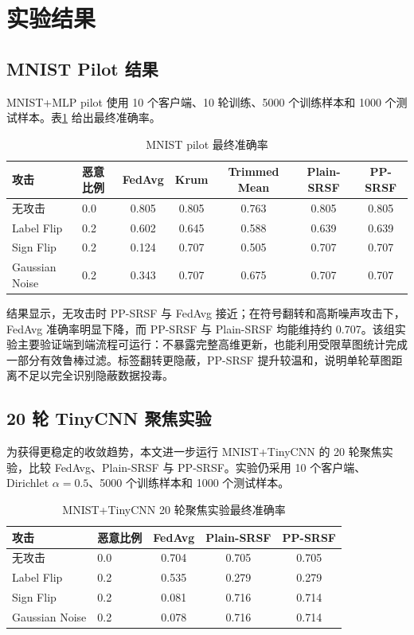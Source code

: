 \documentclass[final]{jcr}
\begin{document}
\section{实验结果}
\subsection{MNIST Pilot 结果}
MNIST+MLP pilot 使用 10 个客户端、10 轮训练、5000 个训练样本和 1000 个测试样本。表\ref{tab:mnist-pilot} 给出最终准确率。

\begin{table}
\centering
\caption{MNIST pilot 最终准确率}{}
\label{tab:mnist-pilot}
\begin{tabular}{llccccc}
\toprule
攻击 & 恶意比例 & FedAvg & Krum & Trimmed Mean & Plain-SRSF & PP-SRSF\\
\midrule
无攻击 & 0.0 & 0.805 & 0.805 & 0.763 & 0.805 & 0.805\\
Label Flip & 0.2 & 0.602 & 0.645 & 0.588 & 0.639 & 0.639\\
Sign Flip & 0.2 & 0.124 & 0.707 & 0.505 & 0.707 & 0.707\\
Gaussian Noise & 0.2 & 0.343 & 0.707 & 0.675 & 0.707 & 0.707\\
\bottomrule
\end{tabular}
\end{table}

结果显示，无攻击时 PP-SRSF 与 FedAvg 接近；在符号翻转和高斯噪声攻击下，FedAvg 准确率明显下降，而 PP-SRSF 与 Plain-SRSF 均能维持约 0.707。该组实验主要验证端到端流程可运行：不暴露完整高维更新，也能利用受限草图统计完成一部分有效鲁棒过滤。标签翻转更隐蔽，PP-SRSF 提升较温和，说明单轮草图距离不足以完全识别隐蔽数据投毒。

\subsection{20 轮 TinyCNN 聚焦实验}
为获得更稳定的收敛趋势，本文进一步运行 MNIST+TinyCNN 的 20 轮聚焦实验，比较 FedAvg、Plain-SRSF 与 PP-SRSF。实验仍采用 10 个客户端、Dirichlet $\alpha=0.5$、5000 个训练样本和 1000 个测试样本。

\begin{table}
\centering
\caption{MNIST+TinyCNN 20 轮聚焦实验最终准确率}{}
\label{tab:tinycnn-long}
\begin{tabular}{llccc}
\toprule
攻击 & 恶意比例 & FedAvg & Plain-SRSF & PP-SRSF\\
\midrule
无攻击 & 0.0 & 0.704 & 0.705 & 0.705\\
Label Flip & 0.2 & 0.535 & 0.279 & 0.279\\
Sign Flip & 0.2 & 0.081 & 0.716 & 0.714\\
Gaussian Noise & 0.2 & 0.078 & 0.716 & 0.714\\
\bottomrule
\end{tabular}
\end{table}
\end{document}
